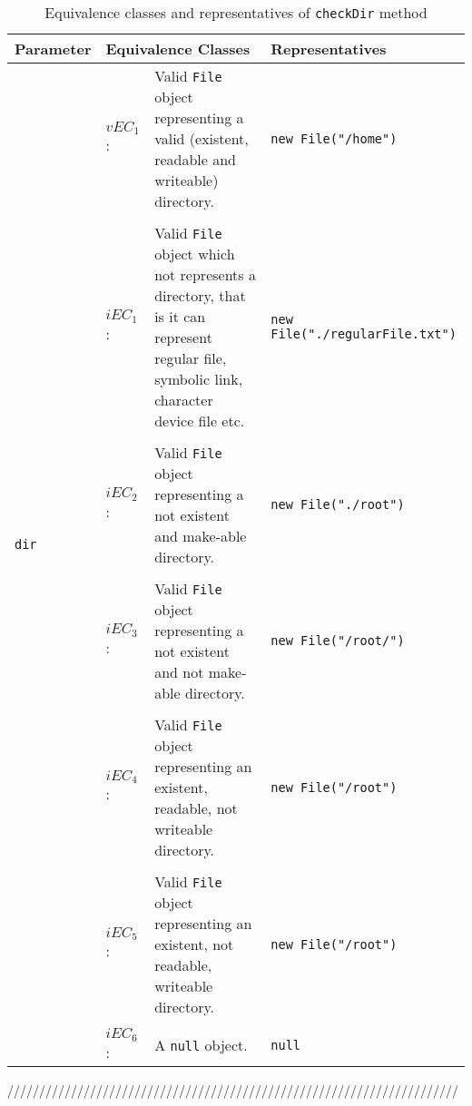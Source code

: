 \documentclass[sigchi]{acmart}
\begin{document}
\begin{table*}
  \caption{Equivalence classes and representatives of \texttt{checkDir} method}
  \label{tab:libraries}
  \begin{tabular}{llp{10cm}p{5cm}}
    \toprule
    \textbf{Parameter} & \multicolumn{2}{|l|}{\textbf{Equivalence Classes}} & \textbf{Representatives} \\
    \midrule
    
	\multirow{12}{*}{\texttt{dir}} & $vEC_1$: & Valid \texttt{File} object representing a valid (existent, readable and writeable) directory. & \texttt{new File("/home")} \\    
    
    \\[-1em] 
    & $iEC_1$: & Valid \texttt{File} object which not represents a directory, that is it can represent regular file, symbolic link, character device file etc. & \texttt{new File("./regularFile.txt")} \\ 
    
    \\[-1em]
    & $iEC_2$: & Valid \texttt{File} object representing a not existent and make-able directory. & \texttt{new File("./root")} \\
    
    \\[-1em]
    & $iEC_3$: & Valid \texttt{File} object representing a not existent and not make-able directory. & \texttt{new File("/root/")} \\
   
    \\[-1em]
    & $iEC_4$: & Valid \texttt{File} object representing an existent, readable, not writeable directory. & \texttt{new File("/root")} \\
    
 	\\[-1em]
    & $iEC_5$: & Valid \texttt{File} object representing an existent, not readable, writeable directory.  & \texttt{new File("/root")} \\    
    
	\\[-1em]
    & $iEC_6$: & A \texttt{null} object. & \texttt{null} \\     
    
    \bottomrule
  \end{tabular}
\end{table*}



///////////////////////////////////////////////////////////////////////
\end{document}
